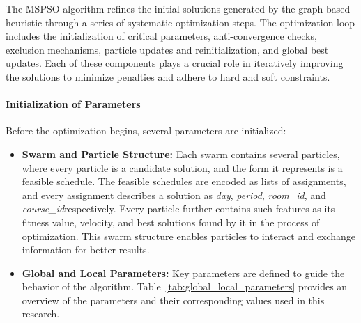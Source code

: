 The MSPSO algorithm refines the initial solutions generated by the graph-based heuristic through a series of systematic optimization steps. The optimization loop includes the initialization of critical parameters, anti-convergence checks, exclusion mechanisms, particle updates and reinitialization, and global best updates. Each of these components plays a crucial role in iteratively improving the solutions to minimize penalties and adhere to hard and soft constraints.

\paragraph{Initialization of Parameters}
Before the optimization begins, several parameters are initialized:

\begin{itemize}
    \item \textbf{Swarm and Particle Structure:} Each swarm contains several particles, where every particle is a candidate solution, and the form it represents is a feasible schedule. The feasible schedules are encoded as lists of assignments, and every assignment describes a solution as \textit{day}, \textit{period}, \textit{room\_id}, and \textit{course\_id}respectively. Every particle further contains such features as its fitness value, velocity, and best solutions found by it in the process of optimization. This swarm structure enables particles to interact and exchange information for better results.
    
    \item \textbf{Global and Local Parameters:} Key parameters are defined to guide the behavior of the algorithm. Table~\ref{tab:global_local_parameters} provides an overview of the parameters and their corresponding values used in this research.


\end{itemize}
